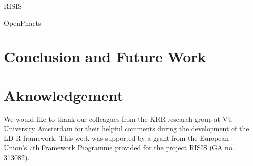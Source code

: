 \documentclass{acm_proc_article-sp}
\begin{document}
RISIS

OpenPhacts

\section{Conclusion and Future Work}

\section{Aknowledgement}
We would like to thank our colleagues from the KRR research group at VU University Amsterdam for their helpful comments during the development of the LD-R framework. This work was supported by a grant from the European Union’s 7th Framework Programme provided for the project RISIS (GA no. 313082).




\end{document}
